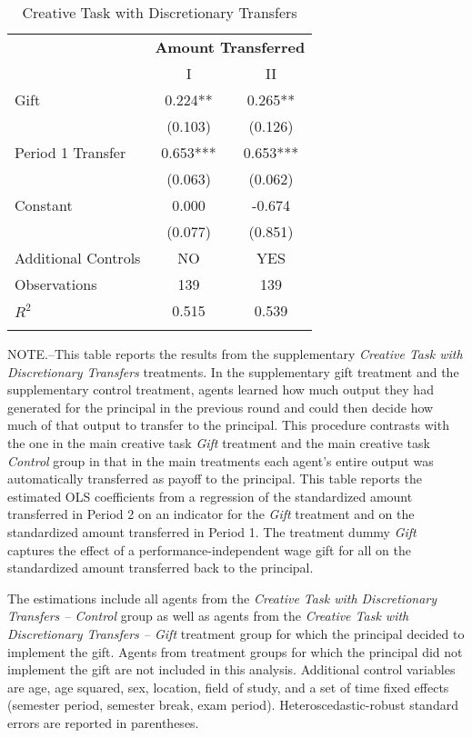 \begin{table}[h]%
\setlength\tabcolsep{6pt}
\caption{Creative Task with Discretionary Transfers}
\begin{center}%
{\small\renewcommand{\arraystretch}{1.2}%
\begin{tabular}{lcc}
\hline\noalign{\smallskip}
 & \multicolumn{2}{c}{\bf Amount Transferred} \\
 & I & II \\
\hline\noalign{\smallskip}
Gift                &       0.224** &       0.265** \\
                    &     (0.103)   &     (0.126)   \\
Period 1 Transfer   &       0.653***&       0.653***\\
                    &     (0.063)   &     (0.062)   \\
Constant            &       0.000   &      -0.674   \\
                    &     (0.077)   &     (0.851)   \\
\hline
 Additional Controls & NO & YES \\
\hline
Observations        &         139   &         139   \\
$R^2$               &       0.515   &       0.539   \\
\hline\noalign{\medskip}
\end{tabular}
\begin{minipage}{\textwidth} \setlength{\parindent}{15pt}
\footnotesize NOTE.--This table reports the results from the supplementary \textit{Creative Task with Discretionary Transfers} treatments. 
In the supplementary gift treatment and the supplementary control treatment, agents learned how much output they had generated for the principal in the previous round and could then decide how much of that output to transfer to the principal. 
This procedure contrasts with the one in the main creative task \textit{Gift} treatment and the main creative task \textit{Control} group in that in the main treatments each agent's entire output was automatically transferred as payoff to the principal. 
This table reports the estimated OLS coefficients from a regression of the standardized amount transferred in Period 2 on an indicator for the \textit{Gift} treatment and on the standardized amount transferred in Period 1. 
The treatment dummy \textit{Gift} captures the effect of a performance-independent wage gift for all on the standardized amount transferred back to the principal. 

The estimations include all agents from the \textit{Creative Task with Discretionary Transfers -- Control} group as well as agents from the \textit{Creative Task with Discretionary Transfers -- Gift} treatment group for which the principal decided to implement the gift. Agents from treatment groups for which the principal did not implement the gift are not included in this analysis. 
Additional control variables are age, age squared, sex, location, field of study, and a set of time fixed effects (semester period, semester break, exam period). 
Heteroscedastic-robust standard errors are reported in parentheses. 


\end{minipage}}
\end{center}
\end{table}

